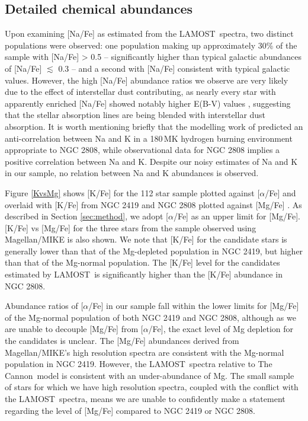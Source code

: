 \documentclass[a4paper,fleqn,usenatbib]{mnras}
\newcommand{\project}[1]{#1}
\newcommand{\lamost}{\project{LAMOST}}
\newcommand{\tc}{\project{The Cannon}}
\begin{document}
\subsection{Detailed chemical abundances}
\label{sec:abundances}

Upon examining [Na/Fe] as estimated from the \lamost\ spectra, two distinct populations were observed: one population making up approximately 30\% of the sample with [Na/Fe] > 0.5 -- significantly higher than typical galactic abundances of [Na/Fe] $\lesssim$ 0.3 \citep{kobayashi2011} -- and a second with [Na/Fe] consistent with typical galactic values. However, the high [Na/Fe] abundance ratios we observe are very likely due to the effect of interstellar dust contributing, as nearly every star with apparently enriched [Na/Fe] showed notably higher E(B-V) values \citep{schlafly2011}, suggesting that the stellar absorption lines are being blended with interstellar dust absorption. It is worth mentioning briefly that the modelling work of \cite{prantzos2017} predicted an anti-correlation between Na and K in a 180\,MK hydrogen burning environment appropriate to NGC 2808, while observational data for NGC 2808 implies a positive correlation between Na and K. Despite our noisy estimates of Na and K in our sample, no relation between Na and K abundances is observed.

Figure \ref{KvsMg} shows [K/Fe]  for the 112 star sample plotted against $[\alpha$/Fe] and overlaid with [K/Fe] from NGC 2419 and NGC 2808 plotted against [Mg/Fe] \citep{cohenkirby2012, mucciarelli2012, mucciarelli2015}. As described in Section \ref{sec:method}, we adopt [$\alpha$/Fe] as an upper limit for [Mg/Fe]. [K/Fe] vs [Mg/Fe] for the three stars from the sample observed using Magellan/MIKE is also shown. 
We note that [K/Fe] for the candidate stars is generally lower than that of the Mg-depleted population in NGC 2419, but higher than that of the Mg-normal population. The [K/Fe] level for the candidates estimated by \lamost\ is significantly higher than the [K/Fe] abundance in NGC 2808. 

Abundance ratios of [$\alpha$/Fe] in our sample fall within the lower limits for [Mg/Fe] of the Mg-normal population of both NGC 2419 and NGC 2808, although as we are unable to decouple [Mg/Fe] from $[\alpha$/Fe], the exact level of Mg depletion for the candidates is unclear. The [Mg/Fe] abundances derived from Magellan/MIKE's high resolution spectra are consistent with the Mg-normal population in NGC 2419. However, the \lamost\ spectra relative to \tc\ model is consistent with an under-abundance of Mg. The small sample of stars for which we have high resolution spectra, coupled with the conflict with the \lamost\ spectra, means we are unable to confidently make a statement regarding the level of [Mg/Fe] compared to NGC 2419 or NGC 2808.
\end{document}
